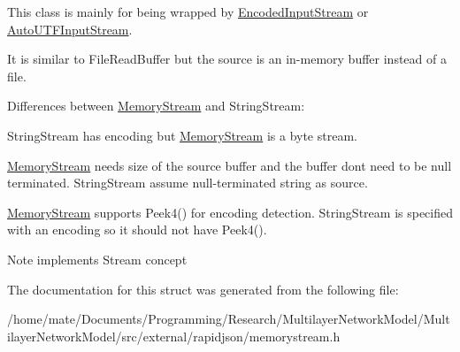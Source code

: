 This class is mainly for being wrapped by \hyperlink{classEncodedInputStream}{Encoded\+Input\+Stream} or \hyperlink{classAutoUTFInputStream}{Auto\+U\+T\+F\+Input\+Stream}.

It is similar to File\+Read\+Buffer but the source is an in-\/memory buffer instead of a file.

Differences between \hyperlink{structMemoryStream}{Memory\+Stream} and String\+Stream\+:
\begin{DoxyEnumerate}
\item String\+Stream has encoding but \hyperlink{structMemoryStream}{Memory\+Stream} is a byte stream.
\item \hyperlink{structMemoryStream}{Memory\+Stream} needs size of the source buffer and the buffer don\textquotesingle{}t need to be null terminated. String\+Stream assume null-\/terminated string as source.
\item \hyperlink{structMemoryStream}{Memory\+Stream} supports Peek4() for encoding detection. String\+Stream is specified with an encoding so it should not have Peek4(). \begin{DoxyNote}{Note}
implements Stream concept 
\end{DoxyNote}

\end{DoxyEnumerate}

The documentation for this struct was generated from the following file\+:\begin{DoxyCompactItemize}
\item 
/home/mate/\+Documents/\+Programming/\+Research/\+Multilayer\+Network\+Model/\+Multilayer\+Network\+Model/src/external/rapidjson/memorystream.\+h\end{DoxyCompactItemize}
